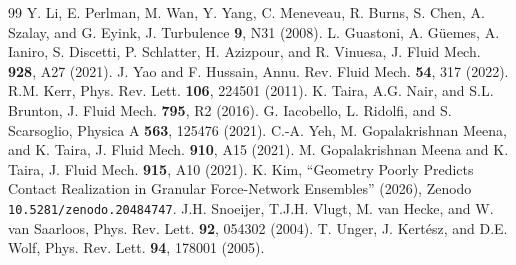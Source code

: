 \documentclass[11pt,a4paper]{article}
\begin{document}
\begin{thebibliography}{99}
 Y. Li, E. Perlman, M. Wan, Y. Yang, C. Meneveau, R. Burns, S. Chen, A. Szalay, and G. Eyink, J. Turbulence \textbf{9}, N31 (2008).
 L. Guastoni, A. G\"uemes, A. Ianiro, S. Discetti, P. Schlatter, H. Azizpour, and R. Vinuesa, J. Fluid Mech. \textbf{928}, A27 (2021).
 J. Yao and F. Hussain, Annu. Rev. Fluid Mech. \textbf{54}, 317 (2022).
 R.M. Kerr, Phys. Rev. Lett. \textbf{106}, 224501 (2011).
 K. Taira, A.G. Nair, and S.L. Brunton, J. Fluid Mech. \textbf{795}, R2 (2016).
 G. Iacobello, L. Ridolfi, and S. Scarsoglio, Physica A \textbf{563}, 125476 (2021).
 C.-A. Yeh, M. Gopalakrishnan Meena, and K. Taira, J. Fluid Mech. \textbf{910}, A15 (2021).
 M. Gopalakrishnan Meena and K. Taira, J. Fluid Mech. \textbf{915}, A10 (2021).
 K. Kim, ``Geometry Poorly Predicts Contact Realization in Granular Force-Network Ensembles'' (2026), Zenodo \texttt{10.5281/zenodo.20484747}.
 J.H. Snoeijer, T.J.H. Vlugt, M. van Hecke, and W. van Saarloos, Phys. Rev. Lett. \textbf{92}, 054302 (2004).
 T. Unger, J. Kert\'esz, and D.E. Wolf, Phys. Rev. Lett. \textbf{94}, 178001 (2005).
\end{thebibliography}
\end{document}
